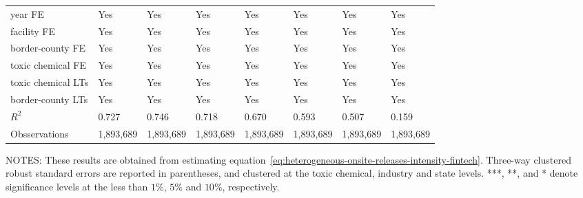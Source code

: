 \begin{table}[H]
{\begin{tabular}{@{}llllllll@{}}
            year FE                         & Yes       & Yes           & Yes       & Yes          & Yes             & Yes           & Yes                 \\
            facility FE                     & Yes       & Yes           & Yes       & Yes          & Yes             & Yes           & Yes                 \\
            border-county FE                & Yes       & Yes           & Yes       & Yes          & Yes             & Yes           & Yes                 \\
            toxic chemical FE               & Yes       & Yes           & Yes       & Yes          & Yes             & Yes           & Yes                 \\
            toxic chemical LTs              & Yes       & Yes           & Yes       & Yes          & Yes             & Yes           & Yes                 \\
            border-county LTs               & Yes       & Yes           & Yes       & Yes          & Yes             & Yes           & Yes                 \\\midrule
            $R^2$                           & 0.727     & 0.746         & 0.718     & 0.670        & 0.593           & 0.507         & 0.159               \\
            Obsservations                   & 1,893,689 & 1,893,689     & 1,893,689 & 1,893,689    & 1,893,689       & 1,893,689     & 1,893,689           \\ \bottomrule \bottomrule
        \end{tabular}%
    }
    \begin{minipage}{\columnwidth}
        \vspace{0.05in}
        \tiny NOTES: These results are obtained from estimating equation~\ref{eq:heterogeneous-onsite-releases-intensity-fintech}. Three-way clustered robust standard errors are reported in parentheses, and clustered at the toxic chemical, industry and state levels. ***, **, and * denote significance levels at the less than $1\%$, $5\%$ and $10\%$, respectively.
    \end{minipage}
\end{table}